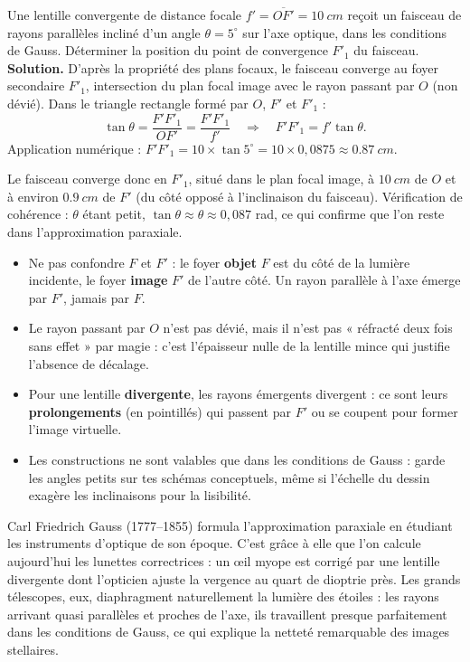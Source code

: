 \documentclass[11pt]{article}
\begin{document}
\begin{exoresolu}
Une lentille convergente de distance focale $f' = \overline{OF'} = \SI{10}{cm}$ reçoit un faisceau de rayons parallèles incliné d'un angle $\theta = 5^{\circ}$ sur l'axe optique, dans les conditions de Gauss. Déterminer la position du point de convergence $F'_1$ du faisceau.
\tcblower
\textbf{Solution.} D'après la propriété des plans focaux, le faisceau converge au foyer secondaire $F'_1$, intersection du plan focal image avec le rayon passant par $O$ (non dévié). Dans le triangle rectangle formé par $O$, $F'$ et $F'_1$ :
\[ \tan\theta = \dfrac{F'F'_1}{OF'} = \dfrac{F'F'_1}{f'} \quad\Longrightarrow\quad F'F'_1 = f'\tan\theta. \]
Application numérique : $F'F'_1 = 10 \times \tan 5^{\circ} = 10 \times 0,0875 \approx \SI{0,87}{cm}$.

Le faisceau converge donc en $F'_1$, situé dans le plan focal image, à $\SI{10}{cm}$ de $O$ et à environ $\SI{0,9}{cm}$ de $F'$ (du côté opposé à l'inclinaison du faisceau). Vérification de cohérence : $\theta$ étant petit, $\tan\theta \approx \theta \approx 0,087$ rad, ce qui confirme que l'on reste dans l'approximation paraxiale.
\end{exoresolu}

\begin{attention}
\begin{itemize}
\item Ne pas confondre $F$ et $F'$ : le foyer \textbf{objet} $F$ est du côté de la lumière incidente, le foyer \textbf{image} $F'$ de l'autre côté. Un rayon parallèle à l'axe émerge par $F'$, jamais par $F$.
\item Le rayon passant par $O$ n'est pas dévié, mais il n'est pas « réfracté deux fois sans effet » par magie : c'est l'épaisseur nulle de la lentille mince qui justifie l'absence de décalage.
\item Pour une lentille \textbf{divergente}, les rayons émergents divergent : ce sont leurs \textbf{prolongements} (en pointillés) qui passent par $F'$ ou se coupent pour former l'image virtuelle.
\item Les constructions ne sont valables que dans les conditions de Gauss : garde les angles petits sur tes schémas conceptuels, même si l'échelle du dessin exagère les inclinaisons pour la lisibilité.
\end{itemize}
\end{attention}

\begin{savaistu}
Carl Friedrich Gauss (1777--1855) formula l'approximation paraxiale en étudiant les instruments d'optique de son époque. C'est grâce à elle que l'on calcule aujourd'hui les lunettes correctrices : un œil myope est corrigé par une lentille divergente dont l'opticien ajuste la vergence au quart de dioptrie près. Les grands télescopes, eux, diaphragment naturellement la lumière des étoiles : les rayons arrivant quasi parallèles et proches de l'axe, ils travaillent presque parfaitement dans les conditions de Gauss, ce qui explique la netteté remarquable des images stellaires.
\end{savaistu}
\end{document}
